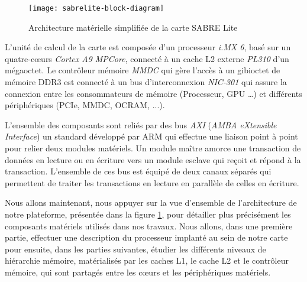 
    \begin{figure}[!ht]
        \centering
        \texttt{[image: sabrelite-block-diagram]}
        \caption{Architecture matérielle simplifiée de la carte SABRE Lite}
        \label{fig:archiIMX6}
    \end{figure}

    L'unité de calcul de la carte est composée d'un processeur \emph{i.MX 6}, basé sur un quatre-cœurs \emph{Cortex A9 MPCore}, connecté à un cache L2 externe \emph{PL310} d'un mégaoctet. Le contrôleur mémoire \emph{MMDC} qui gère l'accès à un gibioctet de mémoire DDR3 est connecté à un bus d'interconnexion \emph{NIC-301} qui assure la connexion entre les consommateurs de mémoire (Processeur, GPU …) et différents périphériques (PCIe, MMDC, OCRAM, ...).

    L'ensemble des composants sont reliés par des bus \emph{AXI} (\emph{AMBA eXtensible Interface}) un standard développé par ARM qui effectue une liaison point à point pour relier deux modules matériels. Un module maître amorce une transaction de données en lecture ou en écriture vers un module esclave qui reçoit et répond à la transaction. L'ensemble de ces bus est équipé de deux canaux séparés qui permettent de traiter les transactions en lecture en parallèle de celles en écriture.


    Nous allons maintenant, nous appuyer sur la vue d'ensemble de l'architecture de notre plateforme, présentée dans la figure \ref{fig:archiIMX6}, pour détailler plus précisément les composants matériels utilisés dans nos travaux. Nous allons, dans une première partie, effectuer une description du processeur implanté au sein de notre carte pour ensuite, dans les parties suivantes, étudier les différents niveaux de hiérarchie mémoire, matérialisés par les caches L1, le cache L2 et le contrôleur mémoire, qui sont partagés entre les cœurs et les périphériques matériels.


